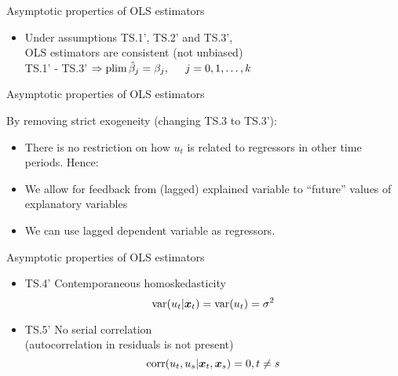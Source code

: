 \documentclass{beamer}
\begin{document}

\begin{frame}{Asymptotic properties of OLS estimators}
\begin{itemize}
\item Under assumptions TS.1', TS.2' and TS.3', \\OLS estimators are consistent (not unbiased)\\
\vspace{0.5cm}
TS.1' - TS.3' $\Rightarrow \textnormal{plim}\,\hat{\beta}_j = \beta_j, \hspace{0.5cm} j=0, 1, \dots, k$
\end{itemize}
\end{frame}


\begin{frame}{Asymptotic properties of OLS estimators}

By removing strict exogeneity (changing TS.3 to TS.3'):
\vspace{0.5cm}
\begin{itemize}
\item There is no restriction on how $u_t$ is related to regressors in other time periods. Hence: 
\vspace{0.5cm}

\item We allow for feedback from (lagged) explained variable to ``future'' values of explanatory variables 
\vspace{0.5cm}

\item We can use lagged dependent variable as regressors.
\end{itemize}

\end{frame}


\begin{frame}{Asymptotic properties of OLS estimators}
\begin{itemize}
\item TS.4' Contemporaneous homoskedasticity
$$\textnormal{var}(u_t|\boldsymbol{x}_t)=\textnormal{var}(u_t)=\sigma^2$$

\vspace{0.5cm}

\item TS.5' No serial correlation \\(autocorrelation in residuals is not present)
$$\textnormal{corr}(u_t,u_s|\boldsymbol{x}_t,\boldsymbol{x}_s ) = 0, t\neq s$$
\end{itemize}
\end{frame}
\end{document}
